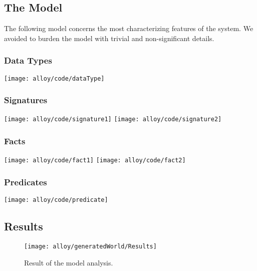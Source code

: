 \subsection{The Model}
	The following model concerns the most characterizing features of the system. We avoided to burden the model with trivial and non-significant details.
	
	\subsubsection*{Data Types}
		\texttt{[image: alloy/code/dataType]}

	\subsubsection*{Signatures}
		\texttt{[image: alloy/code/signature1]}
		\vfill
		\texttt{[image: alloy/code/signature2]}
	
	\subsubsection*{Facts}
		\texttt{[image: alloy/code/fact1]}
		\vfill
		\texttt{[image: alloy/code/fact2]}
	
	\subsubsection*{Predicates}
		\texttt{[image: alloy/code/predicate]}
		\bigskip
		
\subsection{Results}
	\begin{figure}[H]
		\centering
		\texttt{[image: alloy/generatedWorld/Results]}
		\caption{Result of the model analysis.}		
		\label{fig:alloyResult}
	\end{figure}
	\bigskip
	
	
	
	

